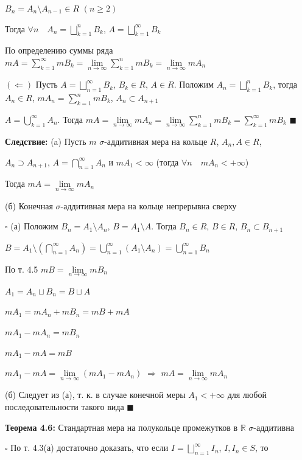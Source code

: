 \documentclass[a4paper]{report}
\begin{document}
\noindent$B_n=A_n\setminus A_{n-1}\in R$ $(n\ge2)$

Тогда $\forall n\quad A_n=\bigsqcup\limits_{k=1}^n B_k$, $A=\bigsqcup\limits_{k=1}^\infty B_k$

По определению суммы ряда $mA=\sum\limits_{k=1}^\infty mB_k=\lim\limits_{n\to\infty}\sum\limits_{k=1}^n mB_k=\lim
\limits_{n\to\infty}mA_n$

$(\Leftarrow)$ Пусть $A=\bigsqcup\limits_{n=1}^\infty B_k$, $B_k\in R$, $A\in R$. Положим $A_n=\bigsqcup\limits_{k=1}^n B_k$, 
тогда $A_n\in R$, $mA_n=\sum\limits_{k=1}^n mB_k$, $A_n\subset A_{n+1}$

$A=\bigcup\limits_{k=1}^\infty A_n$. Тогда $mA=\lim\limits_{n\to\infty}mA_n=\lim\limits_{n\to\infty}\sum\limits_{k=1}^n mB_k=
\sum\limits_{k=1}^\infty mB_k$ $\blacksquare$
\bigskip

\noindent\textbf{Следствие:} (a) Пусть $m$ $\sigma$-аддитивная мера на кольце $R$, $A_n,A\in R$, 

\noindent $A_n\supset A_{n+1}$, $A=\bigcap\limits_{n=1}^\infty A_n$ и $mA_1<\infty$ (тогда $\forall n\quad mA_n<+\infty$)

Тогда $mA=\lim\limits_{n\to\infty} mA_n$

(б) Конечная $\sigma$-аддитивная мера на кольце непрерывна сверху

\noindent $\square$ (а) Положим $B_n=A_1\setminus A_n$, $B=A_1\setminus A$. Тогда $B_n\in R$, $B\in R$, $B_n\subset B_{n+1}$

$B=A_1\setminus\left(\bigcap\limits_{n=1}^\infty A_n\right)=\bigcup\limits_{n=1}^\infty\left(A_1\setminus A_n\right)=
\bigcup\limits_{n=1}^\infty B_n$

По т. 4.5 $m B=\lim\limits_{n\to\infty} mB_n$

$A_1=A_n\sqcup B_n=B\sqcup A$

$mA_1=mA_n+mB_n=mB+mA$

$mA_1-mA_n=mB_n$

$mA_1-mA=mB$

$mA_1-mA=\lim\limits_{n\to\infty}(mA_1-mA_n)$ $\Rightarrow$ $mA=\lim\limits_{n\to\infty} mA_n$

(б) Следует из (а), т. к. в случае конечной меры $A_1<+\infty$ для любой последовательности такого вида $\blacksquare$
\bigskip

\noindent\textbf{Теорема 4.6:} Стандартная мера на полукольце промежутков в $\mathbb R$ $\sigma$-аддитивна

\noindent $\square$ По т. 4.3(а) достаточно доказать, что если $I=\bigsqcup\limits_{n=1}^\infty I_n$, $I,I_n\in S$, то 
\end{document}
